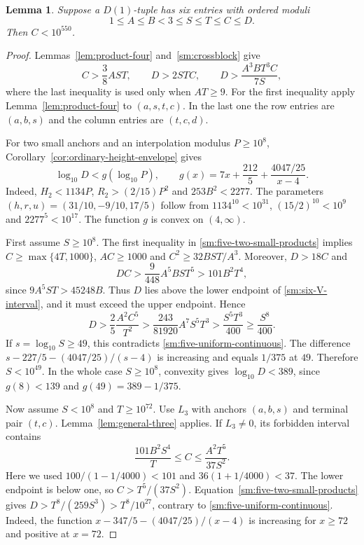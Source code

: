 \documentclass[12pt]{article}
\newtheorem{lemma}[theorem]{Lemma}
\numberwithin{equation}{section}
\begin{document}
\begin{lemma}\label{sm:bs7-cutoff}
Suppose a $D(1)$-tuple has six entries with ordered moduli
\[
 1\le A\le B<3\le S\le T\le C\le D.
\]
Then $C<10^{550}$.
\end{lemma}
\begin{proof}
Lemmas~\ref{lem:product-four} and~\ref{sm:crossblock} give
\begin{equation}\label{sm:five-two-small-products}
 C>\frac38AST,\qquad D>2STC,\qquad
 D>\frac{A^3BT^3C}{7S},
\end{equation}
where the last inequality is used only when $AT\ge9$.
For the first inequality apply Lemma~\ref{lem:product-four} to
$(a,s,t,c)$. In the last one the row entries are $(a,b,s)$ and the
column entries are $(t,c,d)$.

For two small anchors and an interpolation modulus $P\ge10^8$,
Corollary~\ref{cor:ordinary-height-envelope} gives
\begin{equation}\label{sm:five-uniform-continuous}
 \log_{10}D<g(\log_{10}P),\qquad
 g(x)=7x+\frac{212}{5}+\frac{4047/25}{x-4}.
\end{equation}
Indeed, $H_2<1134P$, $R_2>(2/15)P^2$ and $253B^2<2277$.
The parameters $(h,r,u)=(31/10,-9/10,17/5)$ follow from
$1134^{10}<10^{31}$, $(15/2)^{10}<10^9$ and $2277^5<10^{17}$.
The function $g$ is convex on $(4,\infty)$.

First assume $S\ge10^8$. The first inequality in
\eqref{sm:five-two-small-products} implies
$C\ge\max\{4T,1000\}$, $AC\ge1000$ and $C^2\ge32BST/A^3$.
Moreover, $D>18C$ and
\[
 DC>\frac9{448}A^5BST^5>101B^2T^4,
\]
since $9A^5ST>45248B$. Thus $D$ lies above the lower endpoint of
\eqref{sm:six-V-interval}, and it must exceed the upper endpoint. Hence
\begin{equation}\label{sm:five-two-small-lower}
 D>\frac25\frac{A^2C^5}{T^2}
  >\frac{243}{81920}A^7S^5T^3
  >\frac{S^5T^3}{400}\ge\frac{S^8}{400}.
\end{equation}
If $s=\log_{10}S\ge49$, this contradicts
\eqref{sm:five-uniform-continuous}. The difference
$s-227/5-(4047/25)/(s-4)$ is increasing and equals $1/375$ at $49$.
Therefore $S<10^{49}$. In the whole case $S\ge10^8$, convexity gives
$\log_{10}D<389$, since $g(8)<139$ and $g(49)=389-1/375$.

Now assume $S<10^8$ and $T\ge10^{72}$. Use $L_3$ with anchors
$(a,b,s)$ and terminal pair $(t,c)$. Lemma~\ref{lem:general-three}
applies. If $L_3\ne0$, its forbidden interval contains
\[
 \frac{101B^2S^4}{T}\le C\le\frac{A^2T^5}{37S^2}.
\]
Here we used $100/(1-1/4000)<101$ and
$36(1+1/4000)<37$. The lower endpoint is below one, so
$C>T^5/(37S^2)$. Equation~\eqref{sm:five-two-small-products} gives
$D>T^8/(259S^3)>T^8/10^{27}$, contrary to
\eqref{sm:five-uniform-continuous}. Indeed,
the function $x-347/5-(4047/25)/(x-4)$ is increasing for $x\ge72$ and positive at $x=72$.


\end{proof}
\end{document}
